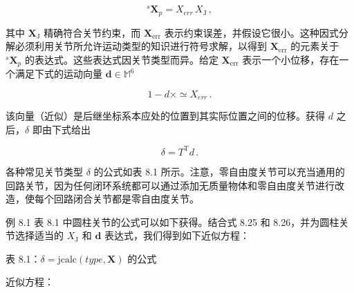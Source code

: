 \documentclass[10pt,a4paper]{book}
\theoremstyle{thmstyle} %
\theoremstyle{defstyle} %
\theoremstyle{prostyle} %
\begin{document}
$$
{ } ^{s} \mathbf { X } _ { p } = X _ { e r r } \, X _ { \mathrm { J } } \, ,
$$



其中 $\mathbf{X}_{\mathrm{J}}$ 精确符合关节约束，而 $\mathbf{X}_{\mathrm{err}}$ 表示约束误差，并假设它很小。这种因式分解必须利用关节所允许运动类型的知识进行符号求解，以得到 $\mathbf{X}_{\mathrm{err}}$ 的元素关于 ${}^{s}\mathbf{X}_{p}$ 的表达式。这些表达式因关节类型而异。给定 $\mathbf{X}_{\mathrm{err}}$ 表示一个小位移，存在一个满足下式的运动向量 $\boldsymbol{d} \in \mathbb{M}^{6}$



$$
1 - d \times \simeq X _ { e r r } \, .
$$



该向量（近似）是后继坐标系本应处的位置到其实际位置之间的位移。获得 $d$ 之后，$\delta$ 即由下式给出



$$
\delta = T ^{\mathrm { T} } d \, .
$$



各种常见关节类型 $\delta$ 的公式如表 8.1 所示。注意，零自由度关节可以充当通用的回路关节，因为任何闭环系统都可以通过添加无质量物体和零自由度关节进行改造，使每个回路闭合关节都是零自由度关节。



例 8.1 表 8.1 中圆柱关节的公式可以如下获得。结合式 8.25 和 8.26，并为圆柱关节选择适当的 $X_{\mathrm{J}}$ 和 $\mathbf{d}$ 表达式，我们得到如下近似方程：



表 8.1：$\delta = \mathrm{jcalc}(type, \mathbf{X})$ 的公式





近似方程：
\end{document}
